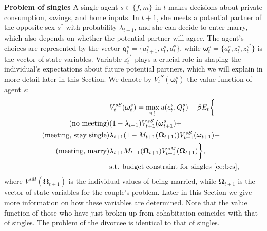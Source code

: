 \documentclass[12pt]{article}
\numberwithin{table}{section}
\begin{document}
\textbf{Problem of singles}
A single agent $s\in\{f,m\}$ in $t$ makes decisions about private consumption, savings, and home inputs. In $t+1$, she meets a potential partner of the opposite sex $s^*$ with probability $\lambda_{t+1}$, and she can decide to enter marry, which also depends on whether the potential partner will agree. The agent's choices are represented by the vector $\mathbf{q}^s_t=\{a^s_{t+1},c^s_t,d^s_t\}$, while $\boldsymbol{\omega}^s_t=\{a^s_t,z^s_t,z^{s^*}_t\}$ is the vector of state variables. Variable $z^{s^*}_t$ plays a crucial role in shaping the individual's expectations about future potential partners, which we will explain in more detail later in this Section. We denote by $V_t^{sS}(\boldsymbol{\omega}^s_t)$ the value function of agent $s$: 
\begin{align}\label{eq:v_single}
	&V_t^{sS}(\boldsymbol{\omega}^s_t)=\max_{\mathbf{q}^s_t} u(c^s_t,Q^s_t)+\beta E_t \bigg\{
	\\\nonumber\tag{no meeting}&(1-\lambda_{t+1})V^{sS}_{t+1}(\boldsymbol{\omega}^s_{t+1})+
	\\\nonumber\tag{meeting, stay single} & \lambda_{t+1} (1-M_{t+1}(\boldsymbol{\Omega}_{t+1})) V^{sS}_{t+1}(\boldsymbol{\omega}_{t+1})+
	\\\nonumber\tag{meeting, marry} & \lambda_{t+1} M_{t+1}(\boldsymbol{\Omega}_{t+1}) V^{sM}_{t+1}(\boldsymbol{\Omega}_{t+1}) \bigg\},
	\\\nonumber &\text{s.t. budget constraint for singles \eqref{eq:bcs},} 
\end{align}
where $V^{sM}(\boldsymbol{\Omega}_{t+1})$ is the individual values of being married, while $\boldsymbol{\Omega}_{t+1}$ is the vector of state variables for the couple's problem. Later in this Section we give more information on how these variables are determined. Note that the value function of those who have just broken up from cohabitation coincides with that of singles. The problem of the divorcee is identical to that of singles.
\end{document}
